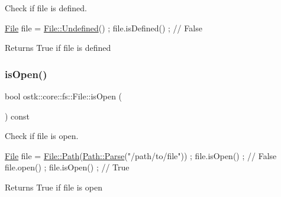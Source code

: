 Check if file is defined. 


\begin{DoxyCode}
\hyperlink{classostk_1_1core_1_1fs_1_1_file_ad1695224996950be9962b8457da369b3}{File} file = \hyperlink{classostk_1_1core_1_1fs_1_1_file_a0df3ba12f33cbbd8f24b9d35cd4afaee}{File::Undefined}() ;
file.isDefined() ; \textcolor{comment}{// False}
\end{DoxyCode}


\begin{DoxyReturn}{Returns}
True if file is defined 
\end{DoxyReturn}
\mbox{\label{classostk_1_1core_1_1fs_1_1_file_a6e719c79ddb035206a6b2ce808258f2e}} 
\subsubsection{\texorpdfstring{is\+Open()}{isOpen()}}
{\footnotesize\ttfamily bool ostk\+::core\+::fs\+::\+File\+::is\+Open (\begin{DoxyParamCaption}{ }\end{DoxyParamCaption}) const}



Check if file is open. 


\begin{DoxyCode}
\hyperlink{classostk_1_1core_1_1fs_1_1_file_ad1695224996950be9962b8457da369b3}{File} file = \hyperlink{classostk_1_1core_1_1fs_1_1_file_ad677c6a3edc1e88c18226edebff1da03}{File::Path}(\hyperlink{classostk_1_1core_1_1fs_1_1_path_ad08539ba654f5df11c4bcb07276345ad}{Path::Parse}(\textcolor{stringliteral}{"/path/to/file"})) ;
file.isOpen() ; \textcolor{comment}{// False}
file.open() ;
file.isOpen() ; \textcolor{comment}{// True}
\end{DoxyCode}


\begin{DoxyReturn}{Returns}
True if file is open 
\end{DoxyReturn}
\mbox{\label{classostk_1_1core_1_1fs_1_1_file_a30689af3e982cf9ae611312695b812ab}} 
